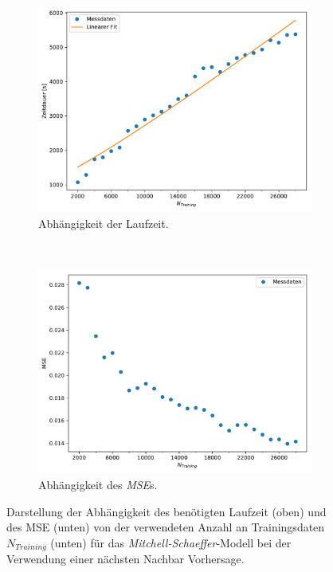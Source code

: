 \begin{appendices}
\begin{figure}[h]
	\centering
	\begin{subfigure}{.95\textwidth}
		\centering
		\hspace*{0.18cm}
		\includegraphics[width=4.8in]{figures/results/cross_prediction/nn_trainlength_vh_time.pdf}
		\caption{Abhängigkeit der Laufzeit.}
	\end{subfigure}
	\\
	\begin{subfigure}{.95\textwidth}
		\centering
		\includegraphics[width=4.8in]{figures/results/cross_prediction/nn_trainlength_vh_mse.pdf}
		\caption{Abhängigkeit des \textit{MSE}s.}
	\end{subfigure}
	\caption{Darstellung der Abhängigkeit des benötigten Laufzeit (oben) und des MSE (unten) von der verwendeten Anzahl an Trainingsdaten $N_{Training}$ (unten) für das \textit{Mitchell-Schaeffer}-Modell bei der Verwendung einer nächsten Nachbar Vorhersage.}
	\label{fig:apx_exp_cross_nn_trainlength_mse_time_ms}
\end{figure}



\end{appendices}
